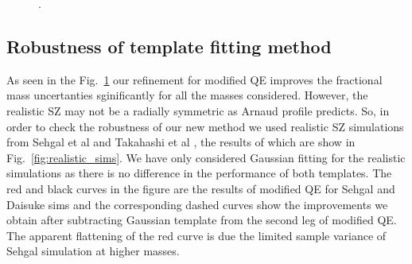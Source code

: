 {\begin{figure}[htb]
{ %
 .
 }
\label{fig:template_fitting}
\end{figure}
\subsection{Robustness of template fitting method}
\label{subsec:simsz}
As seen in the Fig.~\ref{fig:template_fitting} our refinement for modified QE improves the fractional mass uncertanties sginificantly for all the masses considered.
 However, the realistic SZ may not be a radially symmetric as Arnaud profile predicts.
So, in order to check the robustness of our new method we used realistic SZ simulations from Sehgal et al \cite{sehgal10} and Takahashi et al \cite{takahashi17}, the results of which are show in Fig.~\ref{fig:realistic_sims}. 
We have only considered Gaussian fitting for the realistic simulations as there is no difference in the performance of both templates.  
The red and black curves in the figure are the results of modified QE for Sehgal and Daisuke sims and the corresponding dashed curves show the improvements we obtain after subtracting Gaussian template from the second leg of modified QE.
 The apparent flattening of the red curve is due the limited sample variance of Sehgal simulation at higher masses.

}
